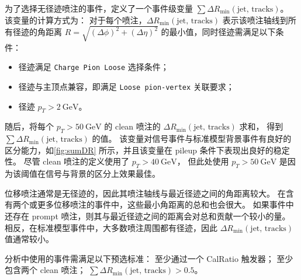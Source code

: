 为了选择无径迹喷注的事件，定义了一个事件级变量 $\sum \Delta R_{\text{min}}(\text{jet, tracks})$。
该变量的计算方式为：
对于每个喷注，\(\Delta R_{\text{min}}(\text{jet, tracks})\) 表示该喷注轴线到所有径迹的角距离
$R = \sqrt{(\Delta \phi)^2 + (\Delta \eta)^2}$ 的最小值，同时径迹需满足以下条件：
\begin{itemize}
    \item 径迹满足 \texttt{Charge Pion Loose} 选择条件；
    \item 径迹与主顶点兼容，即满足 \texttt{Loose pion-vertex} 关联要求；
    \item 径迹 \(p_T > 2~\text{GeV}\)。
\end{itemize}
随后，将每个 \(p_T > 50~\text{GeV}\) 的 clean 喷注的 \(\Delta R_{\text{min}}(\text{jet, tracks})\) 求和，
得到 \(\sum \Delta R_{\text{min}}(\text{jet, tracks})\) 的值。
该变量对信号事件与标准模型背景事件有良好的区分能力，如\autoref{fig:sumDR} 所示，并且该变量在 pileup 条件下表现出良好的稳定性。
尽管 clean 喷注的定义使用了 \(p_T > 40~\text{GeV}\)，
但此处使用 \(p_T > 50~\text{GeV}\) 是因为该阈值在信号与背景的区分上效果最佳。

位移喷注通常是无径迹的，因此其喷注轴线与最近径迹之间的角距离较大。
在含有两个或更多位移喷注的事件中，这些最小角距离的总和也会很大。
如果事件中还存在 prompt 喷注，则其与最近径迹之间的距离会对总和贡献一个较小的量。
相反，在标准模型事件中，大多数喷注周围都有径迹，因此 \(\Delta R_{\text{min}}(\text{jet, tracks})\) 值通常较小。

分析中使用的事件需满足以下预选标准：
至少通过一个 CalRatio 触发器；
至少包含两个 clean 喷注；
\(\sum \Delta R_{\text{min}}(\text{jet, tracks}) > 0.5\)。





